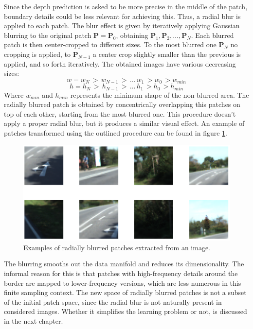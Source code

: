 Since the depth prediction is asked to be more precise in the middle of the patch, boundary details could be less relevant for achieving this.
Thus, a radial blur is applied to each patch.
The blur effect is given by iteratively applying Gaussian blurring to the original patch $\mathbf{P} = \mathbf{P}_{0}$, obtaining $\mathbf{P}_{1}, \mathbf{P}_{2}, \dotsc, \mathbf{P}_{N}$.
Each blurred patch is then center-cropped to different sizes.
To the most blurred one $\mathbf{P}_{N}$ no cropping is applied, to $\mathbf{P}_{N-1}$ a center crop slightly smaller than the previous is applied, and so forth iteratively.
The obtained images have various decreasing sizes:
\[
    w = w_{N} \, > \, w_{N-1} \, > \, \dotsc \, w_{1} \, > w_{0} \, > w_{min}
\]\[
    h = h_{N} \, > \, h_{N-1} \, > \, \dotsc \, h_{1} \, > h_{0} \, > h_{min}
\]
Where $w_{min}$ and $h_{min}$ represents the minimum shape of the non-blurred area.
The radially blurred patch is obtained by concentrically overlapping this patches on top of each other, starting from the most blurred one.
This procedure doesn't apply a proper radial blur, but it produces a similar visual effect.
An example of patches transformed using the outlined procedure can be found in figure \ref{fig:blur}.
\begin{figure}
    \centering
    \includegraphics[width=\textwidth]{figs/blur}
    \caption{
        Examples of radially blurred patches extracted from an image.
        \label{fig:blur}
    }
\end{figure}
The blurring smooths out the data manifold and reduces its dimensionality.
The informal reason for this is that patches with high-frequency details around the border are mapped to lower-frequency versions, which are less numerous in this finite sampling context.
The new space of radially blurred patches is not a subset of the initial patch space, since the radial blur is not naturally present in considered images.
Whether it simplifies the learning problem or not, is discussed in the next chapter.

